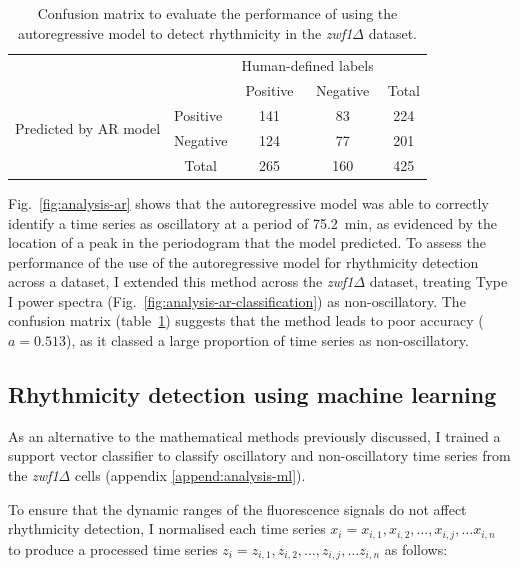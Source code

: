 \begin{table}
  \centering
  \begin{tabular}{l|l|c|c|c}
    \multicolumn{2}{c}{}&\multicolumn{2}{c}{Human-defined labels}&\\
    \cline{3-4}
    \multicolumn{2}{c|}{}&Positive&Negative&\multicolumn{1}{c}{Total}\\
    \cline{2-4}
    \multirow{2}{*}{Predicted by AR model}& Positive & 141 & 83 & 224\\
    \cline{2-4}
    & Negative & 124 & 77 & 201\\
    \cline{2-4}
    \multicolumn{1}{c}{} & \multicolumn{1}{c}{Total} & \multicolumn{1}{c}{265} & \multicolumn{1}{c}{160} & \multicolumn{1}{c}{425}\\
  \end{tabular}
  \caption{
    Confusion matrix to evaluate the performance of using the autoregressive model \parencite{jiaFrequencyDomainAnalysis2020} to detect rhythmicity in the \textit{zwf1$\Delta$} dataset.
  }
  \label{tab:analysis-ar-confusion-matrix}
\end{table}

Fig.\ \ref{fig:analysis-ar} shows that the autoregressive model was able to correctly identify a time series as oscillatory at a period of \SI{75.2}{\minute}, as evidenced by the location of a peak in the periodogram that the model predicted.
To assess the performance of the use of the autoregressive model for rhythmicity detection across a dataset, I extended this method across the \textit{zwf1$\Delta$} dataset, treating Type I power spectra (Fig.\ \ref{fig:analysis-ar-classification}) as non-oscillatory.
The confusion matrix (table~\ref{tab:analysis-ar-confusion-matrix}) suggests that the method leads to poor accuracy ($a = 0.513$), as it classed a large proportion of time series as non-oscillatory.


\subsection{Rhythmicity detection using machine learning}
\label{subsec:analysis-classification-ml}

As an alternative to the mathematical methods previously discussed, I trained a support vector classifier to classify oscillatory and non-oscillatory time series from the \textit{zwf1$\Delta$} cells (appendix \ref{append:analysis-ml}).

To ensure that the dynamic ranges of the fluorescence signals do not affect rhythmicity detection, I normalised each time series $x_{i} = x_{i,1}, x_{i,2}, \ldots , x_{i,j}, \ldots x_{i,n}$ to produce a processed time series $z_{i} = z_{i,1}, z_{i,2}, \ldots , z_{i,j}, \ldots z_{i,n}$ as follows:


